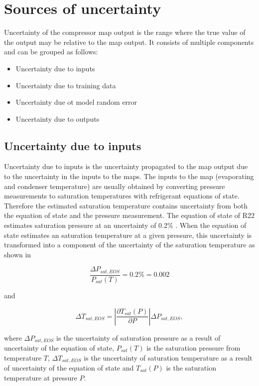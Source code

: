 \section{Sources of uncertainty} \label{sec:sources}
\label{sec:uncer_source}

Uncertainty of the compressor map output is the range where the true value of the output may be relative to the map output. It consists of multiple components and can be grouped as follows:

\begin{itemize}
\item Uncertainty due to inputs
\item Uncertainty due to training data
\item Uncertainty due ot model random error
\item Uncertainty due to outputs
\end{itemize}

\subsection{Uncertainty due to inputs} \label{subsec:uncer_inputs}
Uncertainty due to inputs is the uncertainty propagated to the map output due to the uncertainty in the inputs to the maps. The inputs to the map (evaporating and condenser temperature) are usually obtained by converting pressure measurements to saturation temperatures with refrigerant equations of state. Therefore the estimated saturation temperature contains uncertainty from both the equation of state and the pressure measurement. The equation of state of R22 estimates saturation pressure at an uncertainty of 0.2\% \cite{Kamei:1995}. When the equation of state estimates an saturation temperature at a given pressure, this uncertainty is transformed into a component of the uncertainty of the saturation temperature as shown in

\begin{equation}
\frac{\Delta P_{sat,EOS}}{P_{sat}(T)} = 0.2\% = 0.002
\label{eq:uncer_p_eos}
\end{equation}

and

\begin{equation}
\Delta {T_{sat,EOS}} = \left|{\frac{{\partial {T_{sat}}({P})}}{{\partial {P}}}}\right|\Delta {P_{sat,EOS}} ,
\label{eq:uncer_t_eos}
\end{equation}

where $\Delta P_{sat,EOS}$ is the uncertainty of saturation pressure as a result of uncertainty of the equation of state, $P_{sat}(T)$ is the saturation pressure from temperature $T$, $\Delta {T_{sat,EOS}}$ is the uncertainty of saturation temperature as a result of uncertainty of the equation of state and ${T_{sat}}({P})$ is the saturation temperature at pressure $P$.

